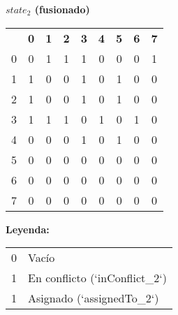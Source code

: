 \documentclass[a4paper,11pt]{article}
\begin{document}
\begin{center}
    \textbf{$state_2$ (fusionado)} \\[4pt]
    \begin{tabular}{c@{\hskip 1em}*{8}{c}}
        \rowcolor{white}
          & \textbf{0}             & \textbf{1}             & \textbf{2}             & \textbf{3}             & \textbf{4}             & \textbf{5}           & \textbf{6}           & \textbf{7}           \\
        0 & \cellcolor{white}0     & \cellcolor{yellow!40}1 & \cellcolor{yellow!40}1 & \cellcolor{yellow!40}1 & \cellcolor{white}0     & \cellcolor{white}0   & \cellcolor{white}0   & \cellcolor{gray!30}1 \\
        1 & \cellcolor{yellow!40}1 & \cellcolor{white}0     & \cellcolor{white}0     & \cellcolor{yellow!40}1 & \cellcolor{white}0     & \cellcolor{gray!30}1 & \cellcolor{white}0   & \cellcolor{white}0   \\
        2 & \cellcolor{yellow!40}1 & \cellcolor{white}0     & \cellcolor{white}0     & \cellcolor{yellow!40}1 & \cellcolor{white}0     & \cellcolor{gray!30}1 & \cellcolor{white}0   & \cellcolor{white}0   \\
        3 & \cellcolor{yellow!40}1 & \cellcolor{yellow!40}1 & \cellcolor{yellow!40}1 & \cellcolor{white}0     & \cellcolor{yellow!40}1 & \cellcolor{white}0   & \cellcolor{gray!30}1 & \cellcolor{white}0   \\
        4 & \cellcolor{white}0     & \cellcolor{white}0     & \cellcolor{white}0     & \cellcolor{yellow!40}1 & \cellcolor{white}0     & \cellcolor{gray!30}1 & \cellcolor{white}0   & \cellcolor{white}0   \\
        5 & \cellcolor{white}0     & \cellcolor{white}0     & \cellcolor{white}0     & \cellcolor{white}0     & \cellcolor{white}0     & \cellcolor{white}0   & \cellcolor{white}0   & \cellcolor{white}0   \\
        6 & \cellcolor{white}0     & \cellcolor{white}0     & \cellcolor{white}0     & \cellcolor{white}0     & \cellcolor{white}0     & \cellcolor{white}0   & \cellcolor{white}0   & \cellcolor{white}0   \\
        7 & \cellcolor{white}0     & \cellcolor{white}0     & \cellcolor{white}0     & \cellcolor{white}0     & \cellcolor{white}0     & \cellcolor{white}0   & \cellcolor{white}0   & \cellcolor{white}0   \\
    \end{tabular}

    \vspace{1em}
    \textbf{Leyenda:}

    \begin{tabular}{ll}
        \cellcolor{white}0     & Vacío                         \\
        \cellcolor{yellow!40}1 & En conflicto (`inConflict_2`) \\
        \cellcolor{gray!30}1   & Asignado (`assignedTo_2`)     \\
    \end{tabular}
\end{center}
\end{document}
